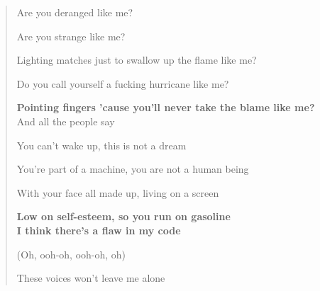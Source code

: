 \documentclass{article}
\begin{document}
\begin{enumerate}
\begin{quotation}
		Are you deranged like me?

		Are you strange like me?

		Lighting matches just to swallow up the flame like me?

		Do you call yourself a fucking hurricane like me?

		\textbf{Pointing fingers 'cause you'll never take the blame like me?}
		\\

		And all the people say

		You can't wake up, this is not a dream

		You're part of a machine, you are not a human being

		With your face all made up, living on a screen

		\textbf{Low on self-esteem, so you run on gasoline}
		\\

		\textbf{I think there's a flaw in my code}

		(Oh, ooh-oh, ooh-oh, oh)

		These voices won't leave me alone


\end{quotation}
\end{enumerate}
\end{document}
